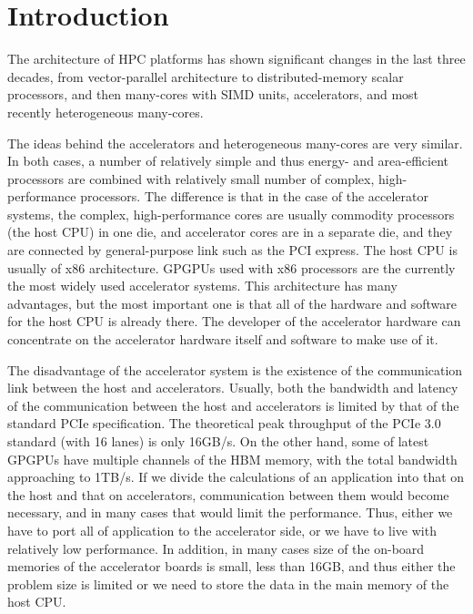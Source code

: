 \documentclass[Afour,sageh,times]{sagej}
\begin{document}

\maketitle

\section{Introduction}
\label{sect:overview}

The architecture of HPC platforms has shown significant changes in the
last three decades, from vector-parallel architecture to
distributed-memory scalar processors, and then many-cores with SIMD
units, accelerators, and most recently heterogeneous many-cores.

The ideas behind the accelerators and heterogeneous many-cores are
very similar. In both cases, a number of relatively simple and thus
energy- and area-efficient processors are combined with relatively
small number of complex, high-performance processors. The difference
is that in the case of the accelerator systems, the complex,
high-performance cores are usually commodity processors (the host CPU)
in one die, and accelerator cores are in a separate die, and they are
connected by general-purpose link such as the PCI express. The host
CPU is usually of x86 architecture.  GPGPUs used with x86 processors
are the currently the most widely used accelerator systems. This
architecture has many advantages, but the most important one is that
all of the hardware and software for the host CPU is already
there. The developer of the accelerator hardware can concentrate on
the accelerator hardware itself and software to make use of it.

The disadvantage of the accelerator system is the existence of the
communication link between the host and accelerators. Usually, both
the bandwidth and latency of the communication between the host and
accelerators is limited by that of the standard PCIe specification.
The theoretical peak throughput of the PCIe 3.0 standard (with 16
lanes) is only 16GB/s. On the other hand, some of latest GPGPUs have
multiple channels of the HBM memory, with the total bandwidth
approaching to 1TB/s.  If we divide the calculations of an application
into that on the host and that on accelerators, communication between
them would become necessary, and in many cases that would limit the
performance. Thus, either we have to port all of application to the
accelerator side, or we have to live with relatively low performance.
In addition, in many cases size of the on-board memories of the
accelerator boards is small, less than 16GB, and thus either the
problem size is limited or we need to store the data in the main
memory of the host CPU.
\end{document}
